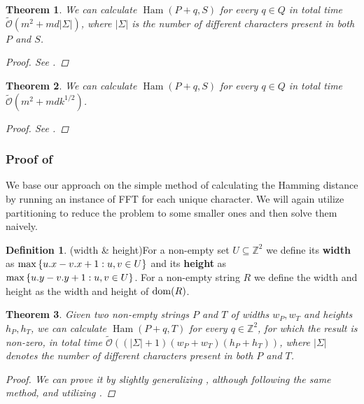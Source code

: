 \documentclass[11pt]{article}
\newcommand{\Z}{\mathbb{Z}}
\newcommand{\tO}{\tilde{\mathcal{O}}}
\newcommand{\set}[1]{\left\lbrace #1 \right\rbrace}
\theoremstyle{plain}
\newtheorem{theorem}{Theorem}
\theoremstyle{definition}
\newtheorem{definition}{Definition}
\theoremstyle{remark}
\DeclareMathOperator*{\Ham}{Ham}
\begin{document}
\begin{theorem}\label{sigma_border}
	We can calculate $\Ham(P + q, S)$ for every $q \in Q$ in total time $\tO(m^2 + md |\Sigma|)$, where $|\Sigma|$ is the number of different characters present in both $P$ and $S$.
	\begin{proof} See . \end{proof}
\end{theorem}

\begin{theorem}\label{dense_algo}
	We can calculate $\Ham(P + q, S)$ for every $q \in Q$ in total time $\tO(m^2 + mdk^{1/2})$.
	\begin{proof} See . \end{proof}
\end{theorem}


\subsubsection{Proof of } \label{sigma_border_proof}

We base our approach on the simple method of calculating the Hamming distance by running an instance of FFT for each unique character.
We will again utilize partitioning to reduce the problem to some smaller ones and then solve them naively.

\begin{definition}(width \& height)\label{width_and_height_definition}
	For a non-empty set $U \subseteq \Z^2$ we define its \textbf{width} as $\max\set{\x{u} - \x{v} + 1 : u, v \in U}$
	and its \textbf{height} as $\max\set{\y{u} - \y{v} + 1 : u, v \in U}$.
	For a non-empty string $R$ we define the width and height as the width and height of $\operatorname*{dom}(R)$.
\end{definition}

\begin{theorem}\label{general_fft}
	Given two non-empty strings $P$ and $T$ of widths $w_P, w_T$ and heights $h_P, h_T$, we can calculate $\Ham(P + q, T)$ for every $q \in \Z^2$, for which the result is non-zero, in total time $\tO((|\Sigma| + 1)(w_P + w_T)(h_P + h_T))$, where $|\Sigma|$ denotes the number of different characters present in both $P$ and $T$.
	\begin{proof}
		We can prove it by slightly generalizing , although following the same method, and utilizing .
	\end{proof}
\end{theorem}
\end{document}
